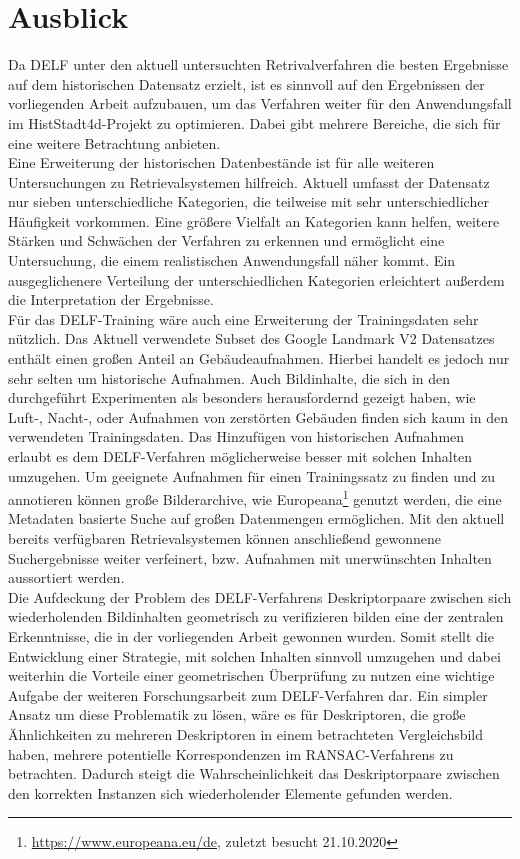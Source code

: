 \section{Ausblick}
Da DELF unter den aktuell untersuchten Retrivalverfahren die besten Ergebnisse auf dem historischen Datensatz erzielt, ist es sinnvoll auf den Ergebnissen der vorliegenden Arbeit aufzubauen, um das Verfahren weiter für den Anwendungsfall im HistStadt4d-Projekt zu optimieren. Dabei gibt mehrere Bereiche, die sich für eine weitere Betrachtung anbieten.
\\
Eine Erweiterung der historischen Datenbestände ist für alle weiteren Untersuchungen zu Retrievalsystemen hilfreich. Aktuell umfasst der Datensatz nur sieben unterschiedliche Kategorien, die teilweise mit sehr unterschiedlicher Häufigkeit vorkommen. Eine größere Vielfalt an Kategorien kann helfen, weitere Stärken und Schwächen der Verfahren zu erkennen und ermöglicht eine Untersuchung, die einem realistischen Anwendungsfall näher kommt. Ein ausgeglichenere Verteilung der unterschiedlichen Kategorien erleichtert außerdem die Interpretation der Ergebnisse.
\\
Für das DELF-Training wäre auch eine Erweiterung der Trainingsdaten sehr nützlich. Das Aktuell verwendete Subset des Google Landmark V2 Datensatzes enthält einen großen Anteil an Gebäudeaufnahmen. Hierbei handelt es jedoch nur sehr selten um historische Aufnahmen. Auch Bildinhalte, die sich in den durchgeführt Experimenten als besonders herausfordernd gezeigt haben, wie Luft-, Nacht-, oder Aufnahmen von zerstörten Gebäuden finden sich kaum in den verwendeten Trainingsdaten. Das Hinzufügen von historischen Aufnahmen erlaubt es dem DELF-Verfahren möglicherweise besser mit solchen Inhalten umzugehen. Um geeignete Aufnahmen für einen Trainingssatz zu finden und zu annotieren können große Bilderarchive, wie Europeana\footnote{\url{https://www.europeana.eu/de}, zuletzt besucht 21.10.2020} genutzt werden, die eine Metadaten basierte Suche auf großen Datenmengen ermöglichen. Mit den aktuell bereits verfügbaren Retrievalsystemen können anschließend gewonnene Suchergebnisse weiter verfeinert, bzw. Aufnahmen mit unerwünschten Inhalten aussortiert werden.
\\
Die Aufdeckung der Problem des DELF-Verfahrens Deskriptorpaare zwischen sich wiederholenden Bildinhalten geometrisch zu verifizieren bilden eine der zentralen Erkenntnisse, die in der vorliegenden Arbeit gewonnen wurden. Somit stellt die Entwicklung einer Strategie, mit solchen Inhalten sinnvoll umzugehen und dabei weiterhin die Vorteile einer geometrischen Überprüfung zu nutzen eine wichtige Aufgabe der weiteren Forschungsarbeit zum DELF-Verfahren dar. Ein simpler Ansatz um diese Problematik zu lösen, wäre es für Deskriptoren, die große Ähnlichkeiten zu mehreren Deskriptoren in einem betrachteten Vergleichsbild haben, mehrere potentielle Korrespondenzen im RANSAC-Verfahrens zu betrachten. Dadurch steigt die Wahrscheinlichkeit das Deskriptorpaare zwischen den korrekten Instanzen sich wiederholender Elemente gefunden werden. 
